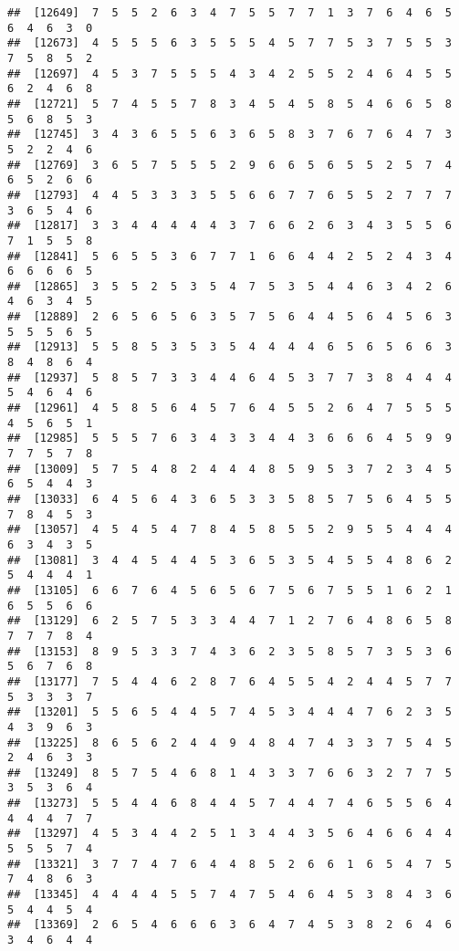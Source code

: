 \documentclass[
]{book}
\begin{document}
\begin{verbatim}
##  [12649]  7  5  5  2  6  3  4  7  5  5  7  7  1  3  7  6  4  6  5  6  4  6  3  0
##  [12673]  4  5  5  5  6  3  5  5  5  4  5  7  7  5  3  7  5  5  3  7  5  8  5  2
##  [12697]  4  5  3  7  5  5  5  4  3  4  2  5  5  2  4  6  4  5  5  6  2  4  6  8
##  [12721]  5  7  4  5  5  7  8  3  4  5  4  5  8  5  4  6  6  5  8  5  6  8  5  3
##  [12745]  3  4  3  6  5  5  6  3  6  5  8  3  7  6  7  6  4  7  3  5  2  2  4  6
##  [12769]  3  6  5  7  5  5  5  2  9  6  6  5  6  5  5  2  5  7  4  6  5  2  6  6
##  [12793]  4  4  5  3  3  3  5  5  6  6  7  7  6  5  5  2  7  7  7  3  6  5  4  6
##  [12817]  3  3  4  4  4  4  4  3  7  6  6  2  6  3  4  3  5  5  6  7  1  5  5  8
##  [12841]  5  6  5  5  3  6  7  7  1  6  6  4  4  2  5  2  4  3  4  6  6  6  6  5
##  [12865]  3  5  5  2  5  3  5  4  7  5  3  5  4  4  6  3  4  2  6  4  6  3  4  5
##  [12889]  2  6  5  6  5  6  3  5  7  5  6  4  4  5  6  4  5  6  3  5  5  5  6  5
##  [12913]  5  5  8  5  3  5  3  5  4  4  4  4  6  5  6  5  6  6  3  8  4  8  6  4
##  [12937]  5  8  5  7  3  3  4  4  6  4  5  3  7  7  3  8  4  4  4  5  4  6  4  6
##  [12961]  4  5  8  5  6  4  5  7  6  4  5  5  2  6  4  7  5  5  5  4  5  6  5  1
##  [12985]  5  5  5  7  6  3  4  3  3  4  4  3  6  6  6  4  5  9  9  7  7  5  7  8
##  [13009]  5  7  5  4  8  2  4  4  4  8  5  9  5  3  7  2  3  4  5  6  5  4  4  3
##  [13033]  6  4  5  6  4  3  6  5  3  3  5  8  5  7  5  6  4  5  5  7  8  4  5  3
##  [13057]  4  5  4  5  4  7  8  4  5  8  5  5  2  9  5  5  4  4  4  6  3  4  3  5
##  [13081]  3  4  4  5  4  4  5  3  6  5  3  5  4  5  5  4  8  6  2  5  4  4  4  1
##  [13105]  6  6  7  6  4  5  6  5  6  7  5  6  7  5  5  1  6  2  1  6  5  5  6  6
##  [13129]  6  2  5  7  5  3  3  4  4  7  1  2  7  6  4  8  6  5  8  7  7  7  8  4
##  [13153]  8  9  5  3  3  7  4  3  6  2  3  5  8  5  7  3  5  3  6  5  6  7  6  8
##  [13177]  7  5  4  4  6  2  8  7  6  4  5  5  4  2  4  4  5  7  7  5  3  3  3  7
##  [13201]  5  5  6  5  4  4  5  7  4  5  3  4  4  4  7  6  2  3  5  4  3  9  6  3
##  [13225]  8  6  5  6  2  4  4  9  4  8  4  7  4  3  3  7  5  4  5  2  4  6  3  3
##  [13249]  8  5  7  5  4  6  8  1  4  3  3  7  6  6  3  2  7  7  5  3  5  3  6  4
##  [13273]  5  5  4  4  6  8  4  4  5  7  4  4  7  4  6  5  5  6  4  4  4  4  7  7
##  [13297]  4  5  3  4  4  2  5  1  3  4  4  3  5  6  4  6  6  4  4  5  5  5  7  4
##  [13321]  3  7  7  4  7  6  4  4  8  5  2  6  6  1  6  5  4  7  5  7  4  8  6  3
##  [13345]  4  4  4  4  5  5  7  4  7  5  4  6  4  5  3  8  4  3  6  5  4  4  5  4
##  [13369]  2  6  5  4  6  6  6  3  6  4  7  4  5  3  8  2  6  4  6  3  4  6  4  4

\end{verbatim}
\end{document}
